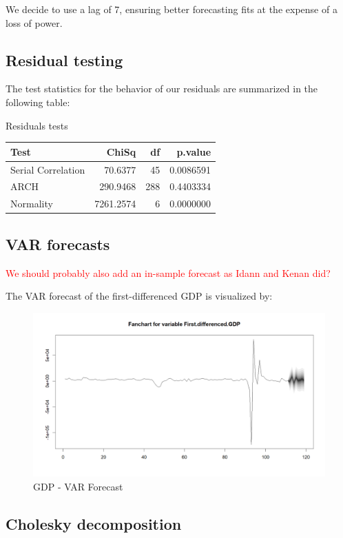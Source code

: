 \documentclass[
]{article}
\begin{document}
We decide to use a lag of 7, ensuring better forecasting fits at the
expense of a loss of power.

\subsection{Residual testing}

The test statistics for the behavior of our residuals are summarized in
the following table:

\bgroup \table[H]
\centering
\caption{\label{tab:unnamed-chunk-22}Residuals tests}
\centering
\begin{tabular}[t]{lrrr}
\toprule
Test & ChiSq & df & p.value\\
\midrule
Serial Correlation & 70.6377 & 45 & 0.0086591\\
ARCH & 290.9468 & 288 & 0.4403334\\
Normality & 7261.2574 & 6 & 0.0000000\\
\bottomrule
\end{tabular}
\endtable\egroup

\subsection{VAR forecasts}

\textcolor{red}{We should probably also add an in-sample forecast as Idann and Kenan did?}

The VAR forecast of the first-differenced GDP is visualized by:

\begin{figure}

{\centering \includegraphics[width=0.8\linewidth]{../results/VAR_forecast2} 

}

\caption{GDP - VAR Forecast}\label{fig:unnamed-chunk-23}
\end{figure}

\subsection{Cholesky decomposition}
\end{document}
